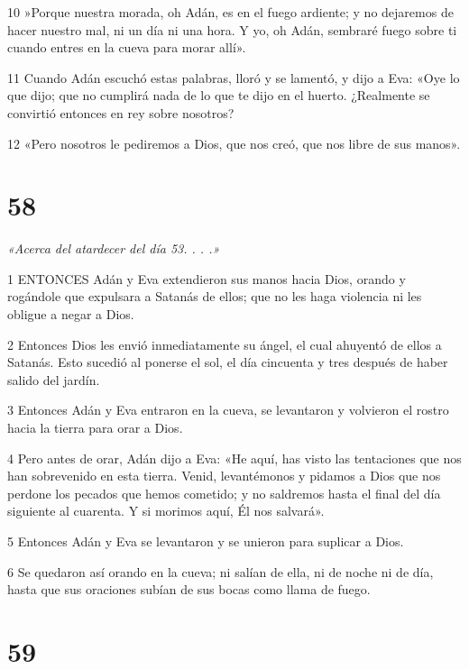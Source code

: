 \par 10 »Porque nuestra morada, oh Adán, es en el fuego ardiente; y no dejaremos de hacer nuestro mal, ni un día ni una hora. Y yo, oh Adán, sembraré fuego sobre ti cuando entres en la cueva para morar allí».

\par 11 Cuando Adán escuchó estas palabras, lloró y se lamentó, y dijo a Eva: «Oye lo que dijo; que no cumplirá nada de lo que te dijo en el huerto. ¿Realmente se convirtió entonces en rey sobre nosotros?

\par 12 «Pero nosotros le pediremos a Dios, que nos creó, que nos libre de sus manos».

\chapter{58}

\par \textit{«Acerca del atardecer del día 53. . . .»}

\par 1 ENTONCES Adán y Eva extendieron sus manos hacia Dios, orando y rogándole que expulsara a Satanás de ellos; que no les haga violencia ni les obligue a negar a Dios.

\par 2 Entonces Dios les envió inmediatamente su ángel, el cual ahuyentó de ellos a Satanás. Esto sucedió al ponerse el sol, el día cincuenta y tres después de haber salido del jardín.

\par 3 Entonces Adán y Eva entraron en la cueva, se levantaron y volvieron el rostro hacia la tierra para orar a Dios.

\par 4 Pero antes de orar, Adán dijo a Eva: «He aquí, has visto las tentaciones que nos han sobrevenido en esta tierra. Venid, levantémonos y pidamos a Dios que nos perdone los pecados que hemos cometido; y no saldremos hasta el final del día siguiente al cuarenta. Y si morimos aquí, Él nos salvará».

\par 5 Entonces Adán y Eva se levantaron y se unieron para suplicar a Dios.

\par 6 Se quedaron así orando en la cueva; ni salían de ella, ni de noche ni de día, hasta que sus oraciones subían de sus bocas como llama de fuego.

\chapter{59}

